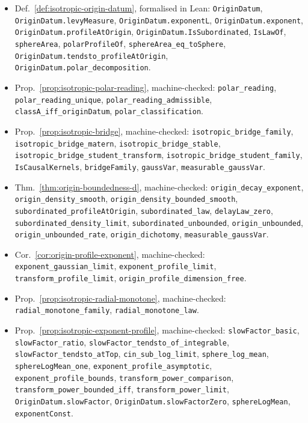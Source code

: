 {\begin{itemize}
\item Def.~\ref{def:isotropic-origin-datum}, formalised in Lean:
  \texttt{OriginDatum}, \texttt{OriginDatum.levyMeasure}, \texttt{OriginDatum.exponentL}, \texttt{OriginDatum.exponent}, \texttt{OriginDatum.profileAtOrigin}, \texttt{OriginDatum.IsSubordinated}, \texttt{IsLawOf}, \texttt{sphereArea}, \texttt{polarProfileOf}, \texttt{sphereArea\_eq\_toSphere}, \texttt{OriginDatum.tendsto\_profileAtOrigin}, \texttt{OriginDatum.polar\_decomposition}.
\item Prop.~\ref{prop:isotropic-polar-reading}, machine-checked:
  \texttt{polar\_reading}, \texttt{polar\_reading\_unique}, \texttt{polar\_reading\_admissible}, \texttt{classA\_iff\_originDatum}, \texttt{polar\_classification}.
\item Prop.~\ref{prop:isotropic-bridge}, machine-checked:
  \texttt{isotropic\_bridge\_family}, \texttt{isotropic\_bridge\_matern}, \texttt{isotropic\_bridge\_stable}, \texttt{isotropic\_bridge\_student\_transform}, \texttt{isotropic\_bridge\_student\_family}, \texttt{IsCausalKernels}, \texttt{bridgeFamily}, \texttt{gaussVar}, \texttt{measurable\_gaussVar}.
\item Thm.~\ref{thm:origin-boundedness-d}, machine-checked:
  \texttt{origin\_decay\_exponent}, \texttt{origin\_density\_smooth}, \texttt{origin\_density\_bounded\_smooth}, \texttt{subordinated\_profileAtOrigin}, \texttt{subordinated\_law}, \texttt{delayLaw\_zero}, \texttt{subordinated\_density\_limit}, \texttt{subordinated\_unbounded}, \texttt{origin\_unbounded}, \texttt{origin\_unbounded\_rate}, \texttt{origin\_dichotomy}, \texttt{measurable\_gaussVar}.
\item Cor.~\ref{cor:origin-profile-exponent}, machine-checked:
  \texttt{exponent\_gaussian\_limit}, \texttt{exponent\_profile\_limit}, \texttt{transform\_profile\_limit}, \texttt{origin\_profile\_dimension\_free}.
\item Prop.~\ref{prop:isotropic-radial-monotone}, machine-checked:
  \texttt{radial\_monotone\_family}, \texttt{radial\_monotone\_law}.
\item Prop.~\ref{prop:isotropic-exponent-profile}, machine-checked:
  \texttt{slowFactor\_basic}, \texttt{slowFactor\_ratio}, \texttt{slowFactor\_tendsto\_of\_integrable}, \texttt{slowFactor\_tendsto\_atTop}, \texttt{cin\_sub\_log\_limit}, \texttt{sphere\_log\_mean}, \texttt{sphereLogMean\_one}, \texttt{exponent\_profile\_asymptotic}, \texttt{exponent\_profile\_bounds}, \texttt{transform\_power\_comparison}, \texttt{transform\_power\_bounded\_iff}, \texttt{transform\_power\_limit}, \texttt{OriginDatum.slowFactor}, \texttt{OriginDatum.slowFactorZero}, \texttt{sphereLogMean}, \texttt{exponentConst}.

\end{itemize}}
